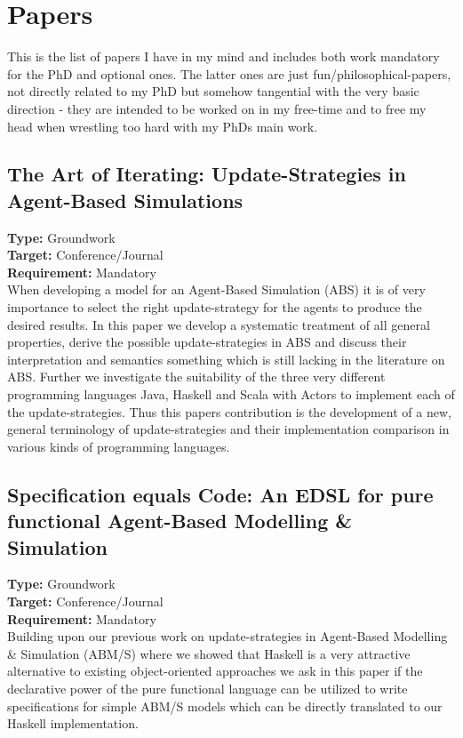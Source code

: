 \section{Papers}
This is the list of papers I have in my mind and includes both work mandatory for the PhD and optional ones. The latter ones are just fun/philosophical-papers, not directly related to my PhD but somehow tangential with the very basic direction - they are intended to be worked on in my free-time and to free my head when wrestling too hard with my PhDs main work.

\subsection{The Art of Iterating: Update-Strategies in Agent-Based Simulations}
\textbf{Type:} Groundwork \\
\textbf{Target:} Conference/Journal \\
\textbf{Requirement:} Mandatory \\

When developing a model for an Agent-Based Simulation (ABS) it is of very importance to select the right update-strategy for the agents to produce the desired results. In this paper we develop a systematic treatment of all general properties, derive the possible update-strategies in ABS and discuss their interpretation and semantics something which is still lacking in the literature on ABS. Further we investigate the suitability of the three very different programming languages Java, Haskell and  Scala with Actors to implement each of the update-strategies. Thus this papers contribution is the development of a new, general terminology of update-strategies and their implementation comparison in various kinds of programming languages.

\subsection{Specification equals Code: An EDSL for pure functional Agent-Based Modelling \& Simulation}
\textbf{Type:} Groundwork \\
\textbf{Target:} Conference/Journal \\
\textbf{Requirement:} Mandatory \\

Building upon our previous work on update-strategies in Agent-Based Modelling \& Simulation (ABM/S) where we showed that Haskell is a very attractive alternative to existing object-oriented approaches we ask in this paper if the declarative power of the pure functional language can be utilized to write specifications for simple ABM/S models which can be directly translated to our Haskell implementation.


